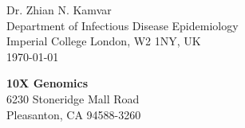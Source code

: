 


\clearpage
\begin{flushright}
  Dr. Zhian N. Kamvar\\
  Department of Infectious Disease Epidemiology\\
  Imperial College London, W2 1NY, UK\\
  \today
\end{flushright}

\textbf{10X Genomics}\\
6230 Stoneridge Mall Road\\
Pleasanton, CA 94588-3260





